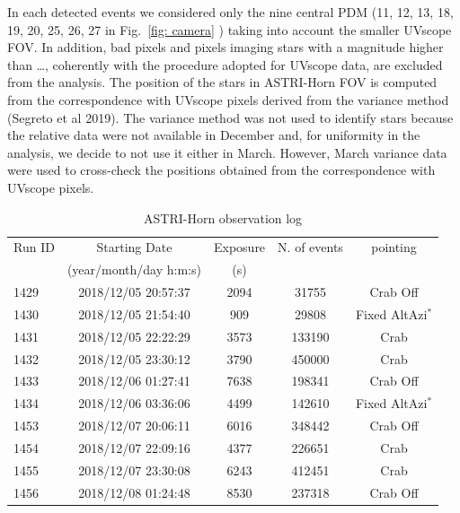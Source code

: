 In each detected events we considered only the nine central PDM (11, 12, 13, 18, 19, 20, 25, 26, 27 in Fig.~\ref{fig: camera} ) taking into account the smaller UVscope FOV.  In addition, bad pixels and pixels imaging stars with a magnitude higher than …, coherently with the procedure adopted for UVscope data, are excluded from the analysis. The position of the stars in ASTRI-Horn FOV is computed from the correspondence with UVscope pixels derived from the variance method (Segreto et al 2019). 
The variance method was not used to identify stars because the relative data were not available in December and, for uniformity in the analysis, we decide to not use it either in March.  However, March variance data were used to cross-check the positions obtained from the correspondence with UVscope pixels.

\begin{table}[ht]
\label{tab:astrilog}
\caption{ASTRI-Horn observation log}
\centering
\begin{tabular}{lcccc}
\hline\hline
Run ID & Starting Date & Exposure      & N. of events & pointing \\
               & (year/month/day h:m:s) & (s)  \\
\hline     
1429 & 2018/12/05 20:57:37  &   2094     & 31755 & Crab Off    \\
1430 & 2018/12/05 21:54:40  &   909      & 29808 & Fixed AltAzi$^*$    \\
1431 & 2018/12/05 22:22:29  &   3573     & 133190 & Crab     \\ %
1432 & 2018/12/05 23:30:12  &   3790     & 450000 & Crab     \\ %
1433 & 2018/12/06 01:27:41  &   7638     & 198341 & Crab Off    \\ %
1434 & 2018/12/06 03:36:06  &   4499     & 142610 &  Fixed AltAzi$^*$  \\ %
1453 & 2018/12/07 20:06:11  &   6016     & 348442 & Crab Off    \\
1454 & 2018/12/07 22:09:16  &   4377     & 226651 &  Crab \\ %
1455 & 2018/12/07 23:30:08  &   6243     & 412451 &  Crab \\ %
1456 & 2018/12/08 01:24:48  &  8530     & 237318 & Crab Off \\ %

\end{tabular}
\end{table}
